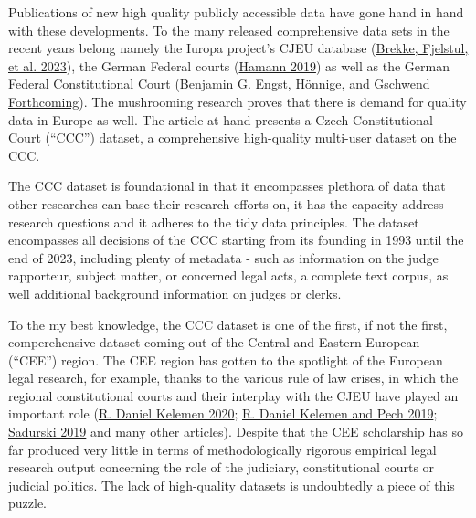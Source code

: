 \documentclass[
  11pt,
]{article}
\begin{document}
Publications of new high quality publicly accessible data have gone hand
in hand with these developments. To the many released comprehensive data
sets in the recent years belong namely the Iuropa project's CJEU
database (\protect\hyperlink{ref-brekkeCJEUDatabasePlatform2023}{Brekke,
Fjelstul, et al. 2023}), the German Federal courts
(\protect\hyperlink{ref-hamannGermanFederalCourts2019}{Hamann 2019}) as
well as the German Federal Constitutional Court
(\protect\hyperlink{ref-engstConstitutionalCourtDatabaseForthcoming}{Benjamin
G. Engst, Hönnige, and Gschwend Forthcoming}). The mushrooming research
proves that there is demand for quality data in Europe as well. The
article at hand presents a Czech Constitutional Court (``CCC'') dataset,
a comprehensive high-quality multi-user dataset on the CCC.

The CCC dataset is foundational in that it encompasses plethora of data
that other researches can base their research efforts on, it has the
capacity address research questions and it adheres to the tidy data
principles. The dataset encompasses all decisions of the CCC starting
from its founding in 1993 until the end of 2023, including plenty of
metadata - such as information on the judge rapporteur, subject matter,
or concerned legal acts, a complete text corpus, as well additional
background information on judges or clerks.

To the my best knowledge, the CCC dataset is one of the first, if not
the first, comperehensive dataset coming out of the Central and Eastern
European (``CEE'') region. The CEE region has gotten to the spotlight of
the European legal research, for example, thanks to the various rule of
law crises, in which the regional constitutional courts and their
interplay with the CJEU have played an important role
(\protect\hyperlink{ref-kelemenEuropeanUnionAuthoritarian2020}{R. Daniel
Kelemen 2020};
\protect\hyperlink{ref-kelemenUsesAbusesConstitutional2019}{R. Daniel
Kelemen and Pech 2019};
\protect\hyperlink{ref-sadurskiPolandConstitutionalBreakdown2019}{Sadurski
2019} and many other articles). Despite that the CEE scholarship has so
far produced very little in terms of methodologically rigorous empirical
legal research output concerning the role of the judiciary,
constitutional courts or judicial politics. The lack of high-quality
datasets is undoubtedly a piece of this puzzle.
\end{document}
